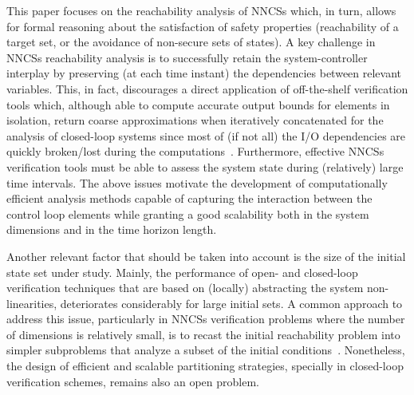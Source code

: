 \documentclass[journal]{IEEEtran}
\begin{document}
This paper focuses on the reachability analysis of NNCSs which, in turn, allows for formal reasoning about the satisfaction of safety properties  (reachability of a target set, or the avoidance of non-secure sets of states). A key challenge in NNCSs reachability analysis is to successfully retain the system-controller interplay by preserving (at each time instant) the dependencies between relevant variables. This, in fact,  discourages a direct application of off-the-shelf verification tools which, although able to compute accurate output bounds for elements in isolation, return coarse approximations when iteratively concatenated for the analysis of closed-loop systems since most of (if not all) the I/O dependencies are quickly broken/lost during the computations~\cite{yang2019efficient,tran2020nnv,claviere2021safety}. Furthermore, effective NNCSs verification tools must be able to assess the system state during (relatively) large time intervals. The above issues motivate the development of computationally efficient  analysis methods capable of  capturing the interaction between the control loop elements  while granting a good scalability both in the system dimensions and in the time horizon length.

Another relevant factor that should be taken into account is the size of the initial state set under study. Mainly, the performance of open- and closed-loop verification techniques that are based on (locally) abstracting the system  non-linearities, deteriorates considerably for large initial sets. A common approach to address this issue, particularly in NNCSs verification problems where the number of dimensions is relatively small,  is to recast the initial reachability problem into simpler subproblems that analyze a subset of the initial conditions~\cite{yang2019efficient,schilling2021verification,claviere2021safety,ivanov2020verifying,sidrane2022overt,everett2021efficient,xiang2020reachable,everett2020robustness}. Nonetheless, the design of efficient and scalable partitioning strategies, specially in closed-loop verification schemes,  remains also an open problem.

\end{document}
